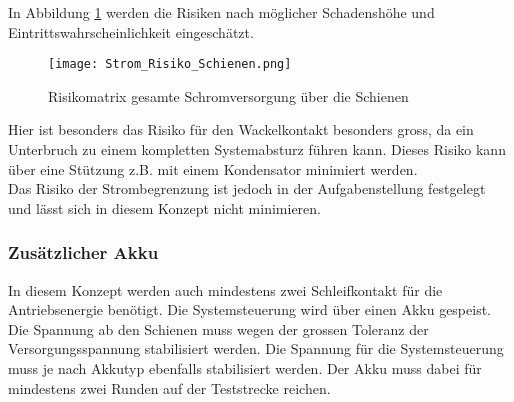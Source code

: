 \documentclass[../../main.tex]{subfiles}
\begin{document}
    In Abbildung \ref{fig:strom_risikomatrix_schienen} werden die Risiken nach möglicher Schadenshöhe und Eintrittswahrscheinlichkeit eingeschätzt.

    \begin{figure}[H]
        \centering
        \texttt{[image: Strom\_Risiko\_Schienen.png]}
        \caption {Risikomatrix gesamte Schromversorgung über die Schienen}
        \label{fig:strom_risikomatrix_schienen}
    \end{figure}

    Hier ist besonders das Risiko für den Wackelkontakt besonders gross, da ein Unterbruch zu einem kompletten Systemabsturz führen kann. Dieses Risiko kann über eine Stützung z.B. mit einem Kondensator minimiert werden.\\
    Das Risiko der Strombegrenzung ist jedoch in der Aufgabenstellung festgelegt und lässt sich in diesem Konzept nicht minimieren.

    \subsubsection{Zusätzlicher Akku}
    In diesem Konzept werden auch mindestens zwei Schleifkontakt für die Antriebsenergie benötigt. Die Systemsteuerung wird über einen Akku gespeist. Die Spannung ab den Schienen muss wegen der grossen Toleranz der Versorgungsspannung stabilisiert werden. Die Spannung für die Systemsteuerung muss je nach Akkutyp ebenfalls stabilisiert werden.
    Der Akku muss dabei für mindestens zwei Runden auf der Teststrecke reichen.
\end{document}
